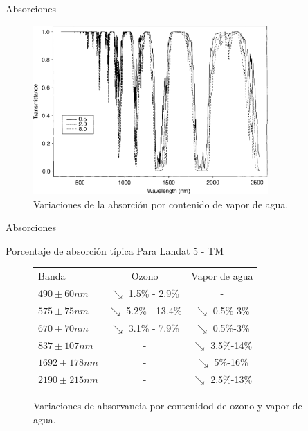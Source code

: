 \documentclass[handout]{beamer}
\begin{document}
\begin{frame}{Absorciones}
  \begin{figure}
  \centering
  \includegraphics[width=0.8\textwidth]{imagenes/vapor.png}
  \caption{Variaciones de la absorción por contenido de vapor de agua.}
  \end{figure}
\end{frame}


\begin{frame}{Absorciones}
  \begin{exampleblock}{Porcentaje de absorción típica}
    Para Landat 5 - TM
    \begin{figure}
      \begin{tabular}{l c c}
        Banda & Ozono  & Vapor de agua    \\
        $490\pm60 nm$& $\searrow$ 1.5\% - 2.9\%     & -  \\
        $575\pm75 nm$& $\searrow$ 5.2\% - 13.4\%    & $\searrow$ 0.5\%-3\%  \\
        $670\pm70 nm$& $\searrow$ 3.1\% - 7.9\%     & $\searrow$ 0.5\%-3\%  \\
        $837\pm107 nm$& -                 & $\searrow$ 3.5\%-14\%  \\
        $1692\pm178 nm$& -                 & $\searrow$ 5\%-16\% \\
        $2190\pm215 nm$& -                 & $\searrow$ 2.5\%-13\% \\
      \end{tabular}
      \caption{Variaciones de absorvancia por contenidod de ozono y vapor de agua. }
    \end{figure}
  \end{exampleblock}
\end{frame}
\end{document}
